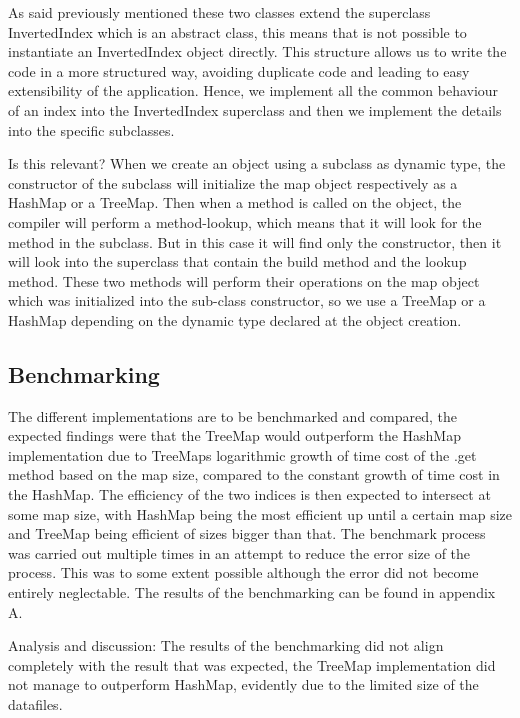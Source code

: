 As said previously mentioned these two classes extend the superclass InvertedIndex which is an abstract class, this means that is not possible to instantiate an InvertedIndex object directly. This structure allows us to write the code in a more structured way, avoiding duplicate code and leading to easy extensibility of the application. Hence, we implement all the common behaviour of an index into the InvertedIndex superclass and then we implement the details into the specific subclasses.

Is this relevant?
When we create an object using a subclass as dynamic type, the constructor of the subclass will initialize the map object respectively as a HashMap or a TreeMap. Then when a method is called on the object, the compiler will perform a method-lookup, which means that it will look for the method in the subclass. But in this case it will find only the constructor, then it will look into the superclass that contain the build method and the lookup method. These two methods will perform their operations on the map object which was initialized into the sub-class constructor, so we use a TreeMap or a HashMap depending on the dynamic type declared at the object creation.


\subsection{Benchmarking}
The different implementations are to be benchmarked and compared, the expected findings were that the TreeMap would outperform the HashMap implementation due to TreeMaps logarithmic growth of time cost of the .get method based on the map size, compared to the constant growth of time cost in the HashMap. 
The efficiency of the two indices is then expected to intersect at some map size, with HashMap being the most efficient up until a certain map size and TreeMap being efficient of sizes bigger than that.
The benchmark process was carried out multiple times in an attempt to reduce the error size of the process. This was to some extent possible although the error did not become entirely neglectable.
The results of the benchmarking can be found in appendix A.

Analysis and discussion:
The results of the benchmarking did not align completely with the result that was expected, the TreeMap implementation did not manage to outperform HashMap, evidently due to the limited size of the datafiles. 


